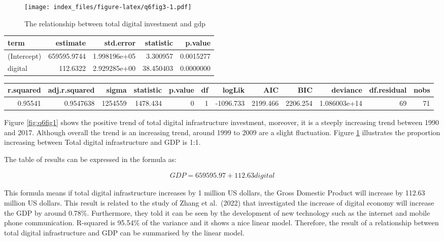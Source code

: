 \documentclass[
]{article}
\begin{document}
\begin{figure}
\centering
\texttt{[image: index\_files/figure-latex/q6fig3-1.pdf]}
\caption{\label{fig:q6fig3}The relationship between total digital investment and gdp}
\end{figure}

\begin{table}
\centering
\begin{tabular}{l|r|r|r|r}
\hline
term & estimate & std.error & statistic & p.value\\
\hline
(Intercept) & 659595.9744 & 1.998196e+05 & 3.300957 & 0.0015277\\
\hline
digital & 112.6322 & 2.929285e+00 & 38.450403 & 0.0000000\\
\hline
\end{tabular}
\end{table}

\begin{table}
\centering
\begin{tabular}{r|r|r|r|r|r|r|r|r|r|r|r}
\hline
r.squared & adj.r.squared & sigma & statistic & p.value & df & logLik & AIC & BIC & deviance & df.residual & nobs\\
\hline
0.95541 & 0.9547638 & 1254559 & 1478.434 & 0 & 1 & -1096.733 & 2199.466 & 2206.254 & 1.086003e+14 & 69 & 71\\
\hline
\end{tabular}
\end{table}

Figure \ref{fig:q6fig1} shows the positive trend of total digital infrastructure investment, moreover, it is a steeply increasing trend between 1990 and 2017. Although overall the trend is an increasing trend, around 1999 to 2009 are a slight fluctuation. Figure \ref{fig:q6fig3} illustrates the proportion increasing between Total digital infrastructure and GDP is 1:1.

The table of results can be expressed in the formula as:

\[
\begin{align*}
{GDP} = 659595.97 + 112.63{digital}
\end{align*}
\]

This formula means if total digital infrastructure increases by 1 million US dollars, the Gross Domestic Product will increase by 112.63 million US dollars. This result is related to the study of Zhang et al.~(2022) that investigated the increase of digital economy will increase the GDP by around 0.78\%. Furthermore, they told it can be seen by the development of new technology such as the internet and mobile phone communication. R-squared is 95.54\% of the variance and it shows a nice linear model. Therefore, the result of a relationship between total digital infrastructure and GDP can be summarised by the linear model.
\end{document}
